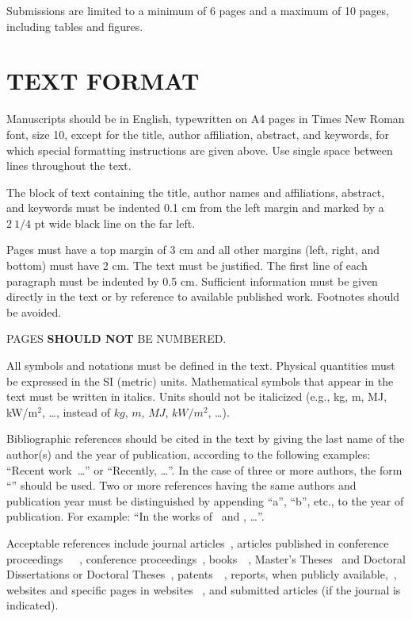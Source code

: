 \documentclass[10pt,fleqn,a4paper,twoside]{article}
\begin{document}
Submissions are limited to a minimum of 6 pages and a maximum of 10 pages, including tables and figures. 

\section{TEXT FORMAT}

Manuscripts should be in English, typewritten on A4 pages in Times New Roman font, size 10, except for the title, author affiliation, abstract, and keywords, for which special formatting instructions are given above. Use single space between lines throughout the text.

The block of text containing the title, author names and affiliations, abstract, and keywords must be indented 0.1 cm from the left margin and marked by a $2\ 1/4$ pt wide black line on the far left.

Pages must have a top margin of 3 cm and all other margins (left, right, and bottom) must have 2 cm. The text must be justified. The first line of each paragraph must be indented by 0.5 cm. Sufficient information must be given directly in the text or by reference to available published work. Footnotes should be avoided.

{\color{red} PAGES {\bf SHOULD NOT} BE NUMBERED.}
 
All symbols and notations must be defined in the text. Physical quantities must be expressed in the SI (metric) units. Mathematical symbols that appear in the text must be written in italics. Units should not be italicized (e.g., kg, m, MJ, kW/m$^2$, \dots, instead of $kg$, $m$, $MJ$, $kW / m^2$, \dots). 

Bibliographic references should be cited in the text by giving the last name of the author(s) and the year of publication, according to the following examples: ``Recent work~\citep{Simas2019}\dots'' or ``Recently, \citet{Simas2019}\dots''. In the case of three or more authors, the form ``\citep{Caraguay2022}'' should be used. Two or more references having the same authors and publication year must be distinguished by appending ``a'', ``b'', etc., to the year of publication. For example: ``In the works of~\citet{Santos2013a} and \citet{Santos2013b}, \dots''.

Acceptable references include journal articles~\citep{Caraguay2022}, articles published in conference proceedings~\citep{Santos2013a}~\citep{Santos2013b}~\citep{Nostrani2019}, conference proceedings~\citep{Carvalho2018}, books~\citep{MendoncaFancello2019}~, Master's Theses~\citep{Spillere2022} and Doctoral Dissertations or Doctoral Theses~\citep{Santos2020}, patents~\citep{Binder2016}~\citep{Fernandes2018}, reports, when publicly available,~\citep{EPE2022}, websites and specific pages in websites ~\citep{MLA20}, and submitted articles (if the journal is indicated).
\end{document}
